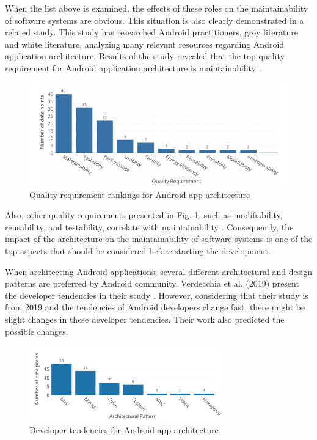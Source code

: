 When the list above is examined, the effects of these roles on the maintainability of software systems are obvious. This situation is also clearly demonstrated in a related study. This study has researched Android practitioners, grey literature and white literature, analyzing many relevant resources regarding Android application architecture. Results of the study revealed that the top quality requirement for Android application architecture is maintainability \cite{14}.
\begin{figure}[ht!]
    \centering
    \includegraphics[scale=0.5]{figures/quality_req.png}
    \caption{Quality requirement rankings for Android app architecture \protect\cite{14}}
    \label{fig:arch_quality_req_ranking}
\end{figure}
\FloatBarrier

Also, other quality requirements presented in Fig. \ref{fig:arch_quality_req_ranking}, such as modifiability, reusability, and testability, correlate with maintainability  \cite{53}. Consequently, the impact of the architecture on the maintainability of software systems is one of the top aspects that should be considered before starting the development.

When architecting Android applications, several different architectural and design patterns are preferred by Android community. Verdecchia et al. (2019) present the developer tendencies in their study \cite{14}. However, considering that their study is from 2019 and the tendencies of Android developers change fast, there might be slight changes in these developer tendencies. Their work also predicted the possible changes.
\begin{figure}[ht!]
    \centering
    \includegraphics[scale=1]{figures/android-architecture.png}
    \caption{Developer tendencies for Android app architecture \protect\cite{14}}
    \label{fig:android-architecture}
\end{figure}
\FloatBarrier


